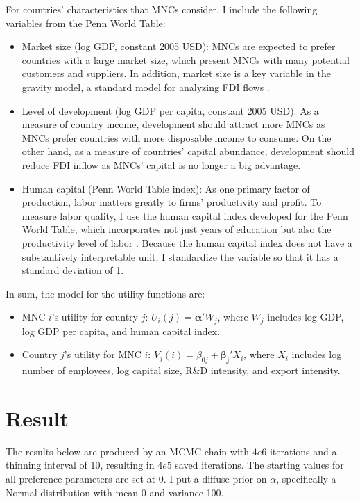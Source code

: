 For countries' characteristics that MNCs consider, I include the following
variables from the Penn World Table:

\begin{itemize}
\item Market size (log GDP, constant 2005 USD): MNCs are expected to prefer countries with a large market
  size, which present MNCs with many potential customers and suppliers. In
  addition, market size is a key variable in the gravity
  model, a standard model for analyzing FDI flows \citep{Bergstrand2007}.

\item Level of development (log GDP per capita, constant 2005 USD): As a measure
  of country income, development should attract more MNCs as MNCs prefer
  countries  with
  more disposable income to consume. On the other hand, as a measure of
  countries' capital
  abundance, development should reduce FDI inflow as MNCs' capital is no longer
  a big advantage.

\item Human capital (Penn World Table index): As one primary factor of
  production, labor matters greatly to firms' productivity and profit. To
  measure labor quality, I use the human capital index developed for the Penn World
  Table, which incorporates not just years of education but also the
  productivity level of labor
  \citep{Feenstra2015}. Because the human capital index does not have a
  substantively interpretable unit, I standardize the variable so that it has a
  standard deviation of 1.
\end{itemize}

In sum, the model for the utility functions are:

\begin{itemize}
\item MNC $i$'s utility for country $j$: $U_i(j) = \bm{\alpha}' W_j $, where $W_j$ includes log GDP, log GDP per capita, and human capital index.
\item Country $j$'s utility for MNC $i$: $V_j(i) = \beta_{0j} + \bm{\beta_j}'
  X_i$, where $X_i$ includes log number of employees, log capital size, R\&D intensity, and
export intensity. 
\end{itemize}

\section{Result}
\label{sec:Japan_result}

The results below are produced by an MCMC chain with $4e6$ iterations and a
thinning interval of 10, resulting in $4e5$ saved iterations. The starting
values for all preference parameters are set at 0. I put a diffuse prior on
$\alpha$, specifically a Normal distribution with mean 0 and variance 100.

